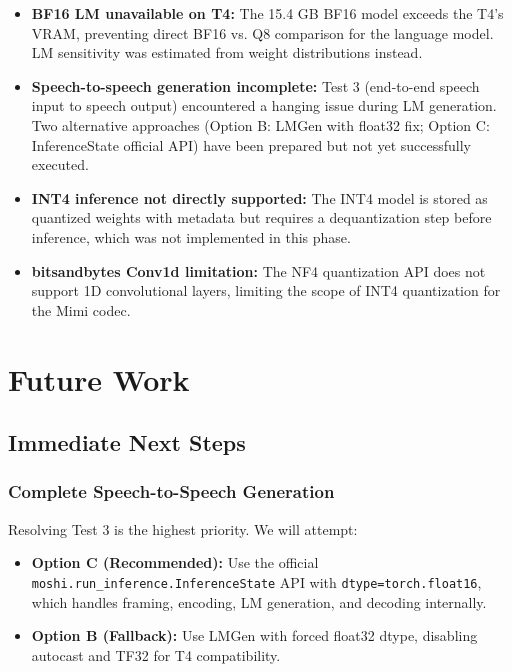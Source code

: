 \documentclass[12pt,a4paper]{report}
\begin{document}
\begin{itemize}
    \item \textbf{BF16 LM unavailable on T4:} The 15.4 GB BF16 model exceeds the T4's VRAM, preventing direct BF16 vs. Q8 comparison for the language model. LM sensitivity was estimated from weight distributions instead.
    
    \item \textbf{Speech-to-speech generation incomplete:} Test 3 (end-to-end speech input to speech output) encountered a hanging issue during LM generation. Two alternative approaches (Option B: LMGen with float32 fix; Option C: InferenceState official API) have been prepared but not yet successfully executed.
    
    \item \textbf{INT4 inference not directly supported:} The INT4 model is stored as quantized weights with metadata but requires a dequantization step before inference, which was not implemented in this phase.
    
    \item \textbf{bitsandbytes Conv1d limitation:} The NF4 quantization API does not support 1D convolutional layers, limiting the scope of INT4 quantization for the Mimi codec.
\end{itemize}

\chapter{Future Work}

\section{Immediate Next Steps}

\subsection{Complete Speech-to-Speech Generation}
Resolving Test 3 is the highest priority. We will attempt:
\begin{itemize}
    \item \textbf{Option C (Recommended):} Use the official \texttt{moshi.run\_inference.InferenceState} API with \texttt{dtype=torch.float16}, which handles framing, encoding, LM generation, and decoding internally.
    \item \textbf{Option B (Fallback):} Use LMGen with forced float32 dtype, disabling autocast and TF32 for T4 compatibility.
\end{itemize}
\end{document}
